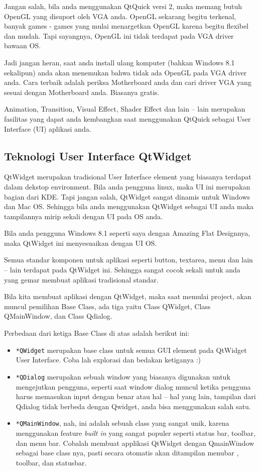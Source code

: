 Jangan salah, bila anda menggunakan QtQuick versi 2, maka memang butuh
OpenGL yang disuport oleh VGA anda. OpenGL sekarang begitu terkenal,
banyak games - games yang mulai menargetkan OpenGL karena begitu
flexibel dan mudah. Tapi sayangnya, OpenGL ini tidak terdapat pada VGA
driver bawaan OS.

Jadi jangan heran, saat anda install ulang komputer (bahkan Windows 8.1
sekalipun) anda akan menemukan bahwa tidak ada OpenGL pada VGA driver
anda. Cara terbaik adalah periksa Motherboard anda dan cari driver VGA
yang sesuai dengan Motherboard anda. Biasanya gratis.

Animation, Transition, Visual Effect, Shader Effect dan lain -- lain
merupakan fasilitas yang dapat anda kembangkan saat menggunakan QtQuick
sebagai User Interface (UI) aplikasi anda.

\subsection{Teknologi User Interface QtWidget}\label{teknologi-user-interface-qtwidget}

QtWidget merupakan tradisional User Interface element yang biasanya
terdapat dalam dekstop environment. Bila anda pengguna linux, maka UI
ini merupakan bagian dari KDE. Tapi jangan salah, QtWidget sangat
dinamis untuk Windows dan Mac OS. Sehingga bila anda menggunakan
QtWidget sebagai UI anda maka tampilannya mirip sekali dengan UI pada OS
anda.

Bila anda pengguna Windows 8.1 seperti saya dengan Amazing Flat
Designnya, maka QtWidget ini menyesuaikan dengan UI OS.

Semua standar komponen untuk aplikasi seperti button, textarea, menu dan
lain -- lain terdapat pada QtWidget ini. Sehingga sangat cocok sekali
untuk anda yang gemar membuat aplikasi tradisional standar.

Bila kita membuat aplikasi dengan QtWidget, maka saat memulai project,
akan muncul pemilihan Base Class, ada tiga yaitu Class QWidget, Class
QMainWindow, dan Class Qdialog.

Perbedaan dari ketiga Base Class di atas adalah berikut ini:

\begin{itemize}
\item
  \texttt{*QWidget} merupakan base class untuk semua GUI element pada
  QtWidget User Interface. Coba lah explorasi dan bedakan ketiganya :)
\item
  \texttt{*QDialog} merupakan sebuah window yang biasanya digunakan
  untuk mengejutkan pengguna, seperti saat window dialog muncul ketika
  pengguna harus memasukan input dengan benar atau hal -- hal yang lain,
  tampilan dari Qdialog tidak berbeda dengan Qwidget, anda bisa
  menggunakan salah satu.
\item
  \texttt{*QMainWindow}, nah, ini adalah sebuah class yang sangat unik,
  karena menggunakan feature \emph{built in} yang sangat populer seperti
  status bar, toolbar, dan menu bar. Cobalah membuat applikasi QtWidget
  dengan QmainWindow sebagai base class nya, pasti secara otomatis akan
  ditampilan menubar , toolbar, dan statusbar.
\end{itemize}

